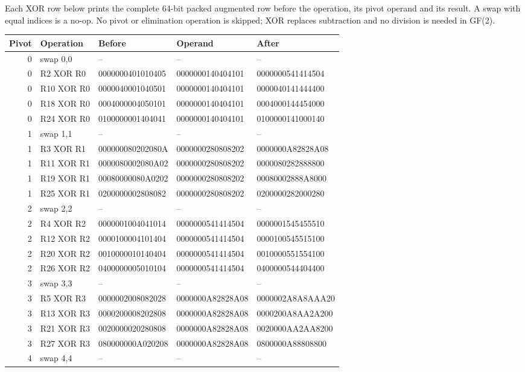 \endgroup
Each XOR row below prints the complete 64-bit packed augmented row before the operation, its pivot operand and its result. A swap with equal indices is a no-op. No pivot or elimination operation is skipped; XOR replaces subtraction and no division is needed in GF(2).
\begingroup\small
\begin{longtable}{rllll}
\toprule
Pivot & Operation & Before & Operand & After\\\midrule
\endhead
0 & swap 0,0 & -- & -- & --\\
0 & R2 XOR R0 & 0000000401010405 & 0000000140404101 & 0000000541414504\\
0 & R10 XOR R0 & 0000040001040501 & 0000000140404101 & 0000040141444400\\
0 & R18 XOR R0 & 0004000004050101 & 0000000140404101 & 0004000144454000\\
0 & R24 XOR R0 & 0100000001404041 & 0000000140404101 & 0100000141000140\\
1 & swap 1,1 & -- & -- & --\\
1 & R3 XOR R1 & 000000080202080A & 0000000280808202 & 0000000A82828A08\\
1 & R11 XOR R1 & 0000080002080A02 & 0000000280808202 & 0000080282888800\\
1 & R19 XOR R1 & 00080000080A0202 & 0000000280808202 & 00080002888A8000\\
1 & R25 XOR R1 & 0200000002808082 & 0000000280808202 & 0200000282000280\\
2 & swap 2,2 & -- & -- & --\\
2 & R4 XOR R2 & 0000001004041014 & 0000000541414504 & 0000001545455510\\
2 & R12 XOR R2 & 0000100004101404 & 0000000541414504 & 0000100545515100\\
2 & R20 XOR R2 & 0010000010140404 & 0000000541414504 & 0010000551554100\\
2 & R26 XOR R2 & 0400000005010104 & 0000000541414504 & 0400000544404400\\
3 & swap 3,3 & -- & -- & --\\
3 & R5 XOR R3 & 0000002008082028 & 0000000A82828A08 & 0000002A8A8AAA20\\
3 & R13 XOR R3 & 0000200008202808 & 0000000A82828A08 & 0000200A8AA2A200\\
3 & R21 XOR R3 & 0020000020280808 & 0000000A82828A08 & 0020000AA2AA8200\\
3 & R27 XOR R3 & 080000000A020208 & 0000000A82828A08 & 0800000A88808800\\
4 & swap 4,4 & -- & -- & --\\

\end{longtable}
